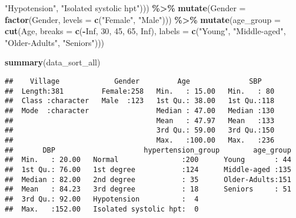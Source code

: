 \documentclass[
]{article}
\newenvironment{Shaded}{\begin{snugshade}}{\end{snugshade}}
\newcommand{\AttributeTok}[1]{\textcolor[rgb]{0.13,0.29,0.53}{#1}}
\newcommand{\ConstantTok}[1]{\textcolor[rgb]{0.56,0.35,0.01}{#1}}
\newcommand{\DecValTok}[1]{\textcolor[rgb]{0.00,0.00,0.81}{#1}}
\newcommand{\FunctionTok}[1]{\textcolor[rgb]{0.13,0.29,0.53}{\textbf{#1}}}
\newcommand{\NormalTok}[1]{#1}
\newcommand{\SpecialCharTok}[1]{\textcolor[rgb]{0.81,0.36,0.00}{\textbf{#1}}}
\newcommand{\StringTok}[1]{\textcolor[rgb]{0.31,0.60,0.02}{#1}}
\begin{document}
\begin{Shaded}
\begin{Highlighting}[]
                                                \StringTok{"Hypotension"}\NormalTok{,}
                                                \StringTok{"Isolated systolic hpt"}\NormalTok{))) }\SpecialCharTok{\%\textgreater{}\%}
  \FunctionTok{mutate}\NormalTok{(}\AttributeTok{Gender =} \FunctionTok{factor}\NormalTok{(Gender, }
                                     \AttributeTok{levels =} \FunctionTok{c}\NormalTok{(}\StringTok{"Female"}\NormalTok{,}
                                                \StringTok{"Male"}\NormalTok{))) }\SpecialCharTok{\%\textgreater{}\%}
  \FunctionTok{mutate}\NormalTok{(}\AttributeTok{age\_group =} \FunctionTok{cut}\NormalTok{(Age, }
                        \AttributeTok{breaks =} \FunctionTok{c}\NormalTok{(}\SpecialCharTok{{-}}\ConstantTok{Inf}\NormalTok{, }\DecValTok{30}\NormalTok{, }\DecValTok{45}\NormalTok{, }\DecValTok{65}\NormalTok{, }\ConstantTok{Inf}\NormalTok{), }
                         \AttributeTok{labels =} \FunctionTok{c}\NormalTok{(}\StringTok{"Young"}\NormalTok{, }\StringTok{"Middle{-}aged"}\NormalTok{, }
                                    \StringTok{"Older{-}Adults"}\NormalTok{, }\StringTok{"Seniors"}\NormalTok{)))}

\FunctionTok{summary}\NormalTok{(data\_sort\_all)}
\end{Highlighting}
\end{Shaded}

\begin{verbatim}
##    Village             Gender         Age              SBP     
##  Length:381         Female:258   Min.   : 15.00   Min.   : 80  
##  Class :character   Male  :123   1st Qu.: 38.00   1st Qu.:118  
##  Mode  :character                Median : 47.00   Median :130  
##                                  Mean   : 47.97   Mean   :133  
##                                  3rd Qu.: 59.00   3rd Qu.:150  
##                                  Max.   :100.00   Max.   :236  
##       DBP                     hypertension_group        age_group  
##  Min.   : 20.00   Normal               :200      Young       : 44  
##  1st Qu.: 76.00   1st degree           :124      Middle-aged :135  
##  Median : 82.00   2nd degree           : 35      Older-Adults:151  
##  Mean   : 84.23   3rd degree           : 18      Seniors     : 51  
##  3rd Qu.: 92.00   Hypotension          :  4                        
##  Max.   :152.00   Isolated systolic hpt:  0
\end{verbatim}
\end{document}
